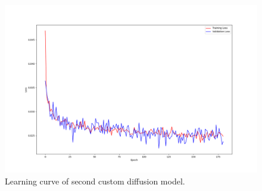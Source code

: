 \documentclass[12pt]{article}
\begin{document}
\begin{figure}[hp]
    \includegraphics[scale=0.4, center]{figures/learning_curve_10.png}
    \caption{Learning curve of second custom diffusion model.}
    \label{fig:learning_curve_10}
\end{figure}
\end{document}
